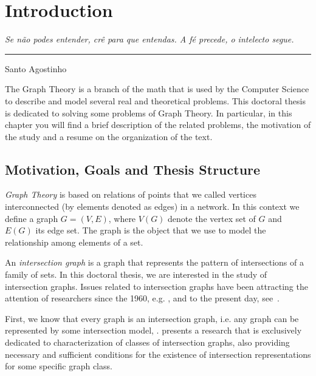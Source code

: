 \chapter{Introduction}

\begin{flushright}
\begin{minipage}[t][0cm][b]{0.47\textwidth}
\emph{Se não podes entender, crê para que entendas. A fé precede, o intelecto segue.}
\end{minipage}

\rule[0cm]{7cm}{0.03cm}%

Santo Agostinho
\end{flushright}

The Graph Theory is a branch of the math that is used by the Computer Science to describe and model several real and theoretical problems.  This doctoral thesis is dedicated to solving some problems of Graph Theory. In particular, in this chapter you will find a brief description of the related problems, the motivation of the study and a resume on the organization of the text.

\section{Motivation, Goals and Thesis Structure}


\emph{Graph Theory} is based on relations of points that we called vertices interconnected (by elements denoted as edges) in a network. In this context we define a graph $G=(V,E)$, where $V(G)$ denote the vertex set of $G$ and $E(G)$ its edge set. The graph is the object that we use to model the relationship among  elements of a set.

An \emph{intersection graph} is a graph that represents the pattern of intersections of a family of sets. In this doctoral thesis, we are interested in the study of intersection graphs. Issues related to intersection graphs have been attracting the attention of researchers since the 1960, e.g. \cite{erdos1966representation}, and to the present day, see~\cite{petito2002grafos,jose2018}.

 First, we know that every graph is an intersection graph, i.e. any graph can be represented by some intersection model, \cite{szpilrajn1945translation, erdos1966representation}. \citet{scheinerman1985characterizing} presents a research that is exclusively dedicated to characterization of classes of intersection graphs, also providing necessary and sufficient conditions for the existence of intersection representations for some specific graph class.


